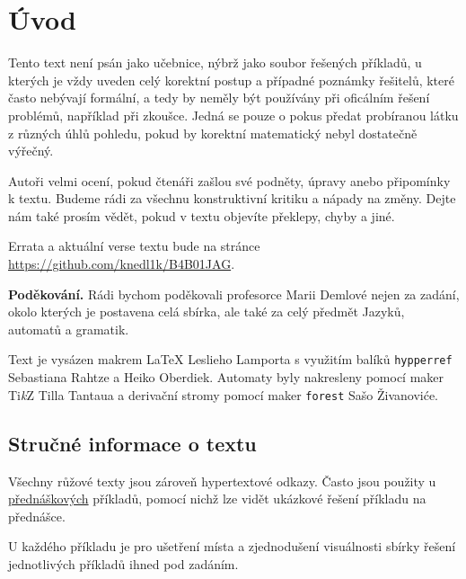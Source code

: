 \section*{Úvod}

\hspace{0.8cm} Tento text není psán jako učebnice, nýbrž jako soubor řešených příkladů, u kterých je vždy uveden celý korektní postup
a případné poznámky řešitelů, které často nebývají formální, a tedy by neměly být používány při oficálním řešení problémů, 
například při zkoušce. Jedná se pouze o pokus předat probíranou látku z různých úhlů pohledu, pokud by korektní matematický
nebyl dostatečně výřečný.

\hspace{0.8cm} Autoři velmi ocení, pokud čtenáři zašlou své podněty, úpravy anebo připomínky k textu. Budeme rádi za všechnu konstruktivní
kritiku a nápady na změny. Dejte nám také prosím vědět, pokud v textu objevíte překlepy, chyby a jiné.

Errata a aktuální verse textu bude na stránce \url{https://github.com/knedl1k/B4B01JAG}.

\textbf{Poděkování.} Rádi bychom poděkovali profesorce Marii Demlové nejen za zadání, okolo kterých je postavena celá sbírka,
ale také za celý předmět Jazyků, automatů a gramatik.

\hspace{0.8cm} Text je vysázen makrem \LaTeX{} Leslieho Lamporta s využitím balíků \texttt{hypperref} \\ 
Sebastiana Rahtze a Heiko Oberdiek. Automaty byly nakresleny pomocí maker Ti\textit{k}Z Tilla Tantaua a derivační
stromy pomocí maker \texttt{forest} Sašo Živanoviće.

\subsection*{Stručné informace o textu}
Všechny růžové texty jsou zároveň hypertextové odkazy. Často jsou použity u  
\href{https://youtube.com/playlist?list=PLQL6z4JeTTQkLuzI78OTnfYBclE1g0UjS&si=7fIuogtxj7mi1HZ-}{přednáškových} 
příkladů, pomocí nichž lze vidět ukázkové řešení příkladu na přednášce.

U každého příkladu je pro ušetření místa a zjednodušení visuálnosti sbírky řešení jednotlivých příkladů ihned pod zadáním.

